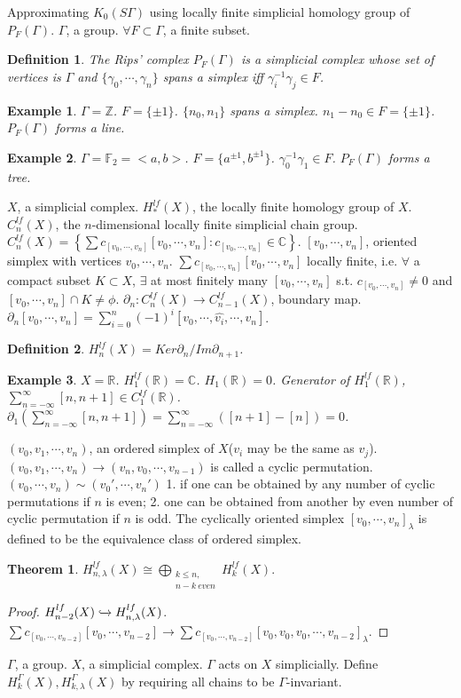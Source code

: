 \documentclass[12pt]{article}
\newtheorem{definition}{Definition}
\newtheorem{example}{Example}
\newtheorem{theorem}{Theorem}
\begin{document}
Approximating $K_0(S\Gamma)$ using locally finite simplicial homology group of $P_F(\Gamma)$. $\Gamma$, a group. $\forall F\subset \Gamma$, a finite subset.
\begin{definition}
The Rips' complex $P_F(\Gamma)$ is a simplicial complex whose set of vertices is $\Gamma$ and $\{\gamma_0,\cdots,\gamma_n\}$ spans a simplex iff $\gamma_i^{-1}\gamma_j\in F$.
\end{definition}
\begin{example}
$\Gamma=\mathbb Z$. $F=\{\pm 1\}$. $\{n_0,n_1\}$ spans a simplex. $n_1-n_0\in F=\{\pm1\}$. $P_F(\Gamma)$ forms a line.
\end{example}
\begin{example}
$\Gamma=\mathbb F_2=<a,b>$. $F=\{a^{\pm1},b^{\pm1} \}$. $\gamma_0^{-1}\gamma_1\in F$. $P_F(\Gamma)$ forms a tree.
\end{example}
$X$, a simplicial complex. $H_*^{lf}(X)$, the locally finite homology group of $X$. $C_n^{lf}(X)$, the $n$-dimensional locally finite simplicial chain group. $C_n^{lf}(X)=\left\{\sum c_{[v_0,\cdots,v_n]}[v_0,\cdots,v_n]:c_{[v_0,\cdots,v_n]}\in \mathbb C \right\}$. $[v_0,\cdots,v_n]$, oriented simplex with vertices $v_0,\cdots,v_n$. $\sum c_{[v_0,\cdots,v_n]}[v_0,\cdots,v_n]$ locally finite, i.e. $\forall$ a compact subset $K\subset X$, $\exists$ at most finitely many $[v_0,\cdots,v_n]$ s.t. $c_{[v_0,\cdots,v_n]}\ne 0$ and $[v_0,\cdots,v_n]\cap K\ne \phi$. $\partial_n:C_n^{lf}(X)\to C_{n-1}^{lf}(X)$, boundary map. $\partial_n[v_0,\cdots,v_n]=\sum_{i=0}^n(-1)^i[v_0,\cdots,\hat{v_i},\cdots,v_n]$.
\begin{definition}
$H_n^{lf}(X)=Ker\partial_n/Im\partial_{n+1}$.
\end{definition}
\begin{example}
$X=\mathbb R$. $H_1^{lf}(\mathbb R)=\mathbb C$. $H_1(\mathbb R)=0$. Generator of $H_1^{lf}(\mathbb R)$, $\sum_{n=-\infty}^\infty[n,n+1]\in C_1^{lf}(\mathbb R)$. $\partial_1\left(\sum_{n=-\infty}^\infty[n,n+1] \right)=\sum_{n=-\infty}^\infty([n+1]-[n])=0$.
\end{example}
$(v_0,v_1,\cdots,v_n)$, an ordered simplex of $X$($v_i$ may be the same as $v_j$). $(v_0,v_1,\cdots,v_n)\to(v_n,v_0,\cdots,v_{n-1})$ is called a cyclic permutation. $(v_0,\cdots,v_n)\sim(v_0',\cdots,v_n')$ 1. if one can be obtained by any number of cyclic permutations if $n$ is even; 2. one can be obtained from another by even number of cyclic permutation if $n$ is odd. The cyclically oriented simplex $[v_0,\cdots,v_n]_\lambda$ is defined to be the equivalence class of ordered simplex.
\begin{theorem}
$H_{n,\lambda}^{lf}(X)\cong\bigoplus\limits_{\substack{k\le n,\\n-k\ even}}H_k^{lf}(X).$
\end{theorem}
\begin{proof}
$H_{n-2}^{lf}(X)\xhookrightarrow[]{}H_{n,\lambda}^{lf}(X)$. $\sum c_{[v_0,\cdots,v_{n-2}]}[v_0,\cdots,v_{n-2}]\to\sum c_{[v_0,\cdots,v_{n-2}]}[v_0,v_0,v_0,\cdots,v_{n-2}]_\lambda$.
\end{proof}
$\Gamma$, a group. $X$, a simplicial complex. $\Gamma$ acts on $X$ simplicially. Define $H_k^\Gamma(X),H_{k,\lambda}^\Gamma(X)$ by requiring all chains to be $\Gamma$-invariant.
\end{document}
